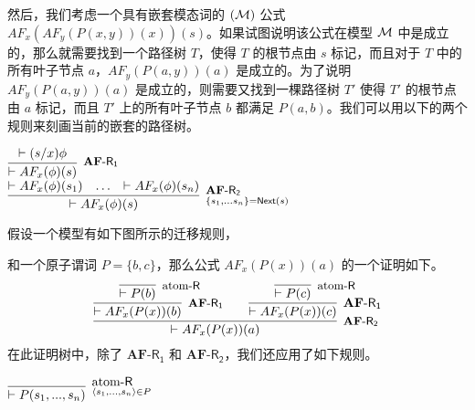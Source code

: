 然后，我们考虑一个具有嵌套模态词的 \CTLP$(\cal M)$ 公式 $AF_x(AF_y(P(x,y))(x))(s)$。如果试图说明该公式在模型 $\cal M$ 中是成立的，那么就需要找到一个路径树 $T$，使得 $T$ 的根节点由 $s$ 标记，而且对于 $T$ 中的所有叶子节点 $a$，$AF_y(P(a,y))(a)$ 是成立的。为了说明 $AF_y(P(a,y))(a)$ 是成立的，则需要又找到一棵路径树 $T'$ 使得 $T'$ 的根节点由 $a$ 标记，而且 $T'$ 上的所有叶子节点 $b$ 都满足 $P(a,b)$。我们可以用以下的两个规则来刻画当前的嵌套的路径树。
\begin{center}
	$\infer[^{\mbox{\small $\mathbf{AF}$-{$\mathsf{R_1}$}}}]{\vdash AF_x(\phi)(s)}{\vdash (s/x)\phi}$\\
	\vspace{10pt}
	$\infer[^{\mbox{\small $\mathbf{AF}$-{$\mathsf{R_2}$}}}_{\{s_1,...s_n\}=\textsf{Next}(s)}]{\vdash AF_x(\phi)(s)}
	{\vdash AF_x(\phi)(s_1) & \ldots & \vdash AF_x(\phi)(s_n)}$
\end{center}

\begin{example}\label{example:exp2}
	假设一个模型有如下图所示的迁移规则，
		\begin{center}
			\centering
		\end{center}
		和一个原子谓词 $P=\{b, c\}$，那么公式 $AF_x(P(x))(a)$ 的一个证明如下。
		$$\infer[{\mbox{\small $\mathbf{AF}$-{$\mathsf{R_2}$}}}]{\vdash
			AF_x(P(x))(a)}{\infer[\mbox{\small $\mathbf{AF}$-{$\mathsf{R_1}$}}]{\vdash
				AF_x(P(x))(b)}{\infer[\mbox{\small atom-\textsf{R}}]{\vdash P(b)}{}} \quad\quad
			\infer[\mbox{$\mathbf{AF}$-{$\mathsf{R_1}$}}]{\vdash
				AF_x(P(x))(c)}{\infer[\mbox{\small atom-\textsf{R}}]{\vdash P(c)}{}}}$$
		在此证明树中，除了 $\mathbf{AF}$-{$\mathsf{R_1}$} 和 $\mathbf{AF}$-{$\mathsf{R_2}$}，我们还应用了如下规则。 
		\begin{center}
			$\infer[^{\mbox{atom-\textsf{R}}}_{\langle s_1,...,s_n\rangle\in P}]{\vdash P(s_1,...,s_n)}{}$
		\end{center}
\end{example}


